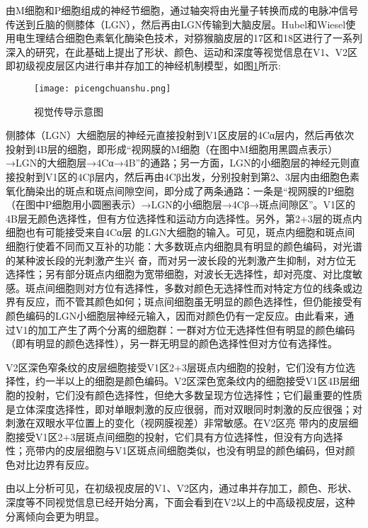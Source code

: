 \documentclass[a4paper,12pt]{article}
\begin{document}
由M细胞和P细胞组成的神经节细胞，通过轴突将由光量子转换而成的电脉冲信号传送到丘脑的侧膝体（LGN），然后再由LGN传输到大脑皮层。Hubel和Wiesel使用电生理结合细胞色素氧化酶染色技术，对猕猴脑皮层的17区和18区进行了一系列深入的研究，在此基础上提出了形状、颜色、运动和深度等视觉信息在V1、V2区即初级视皮层区内进行串并存加工的神经机制模型，如图\ref{fig 10}所示:


\begin{figure}[!htb]
\centering
\texttt{[image: picengchuanshu.png]}
\caption{视觉传导示意图}\label{fig 10} 
\end{figure}




侧膝体（LGN）大细胞层的神经元直接投射到V1区皮层的4Cα层内，然后再依次投射到4B层的细胞，即形成“视网膜的M细胞（在图中M细胞用黑圆点表示）→LGN的大细胞层→4Cα→4B”的通路；另一方面，LGN的小细胞层的神经元则直接投射到V1区的4Cβ层内，然后再由4Cβ出发，分别投射到第2、3层内由细胞色素氧化酶染出的斑点和斑点间隙空间，即分成了两条通路：一条是“视网膜的P细胞（在图中P细胞用小圆圈表示）→LGN的小细胞层→4Cβ→斑点间隙区”。V1区的4B层无颜色选择性，但有方位选择性和运动方向选择性\cite{15:book}。另外，第2+3层的斑点内细胞也有可能接受来自4Cα层 的LGN大细胞的输入。可见，斑点内细胞和斑点间细胞行使着不同而又互补的功能：大多数斑点内细胞具有明显的颜色编码，对光谱的某种波长段的光刺激产生兴 奋，而对另一波长段的光刺激产生抑制，对方位无选择性；另有部分斑点内细胞为宽带细胞，对波长无选择性，却对亮度、对比度敏感。斑点间细胞则对方位有选择性，多数对颜色无选择性而对特定方位的线条或边界有反应，而不管其颜色如何；斑点间细胞虽无明显的颜色选择性，但仍能接受有颜色编码的LGN小细胞层神经元输入，因而对颜色仍有一定反应。由此看来，通过V1的加工产生了两个分离的细胞群：一群对方位无选择性但有明显的颜色编码（即有明显的颜色选择性），另一群无明显的颜色选择性但对方位有选择性\cite{14:misc}。
         


V2区深色窄条纹的皮层细胞接受V1区2+3层斑点内细胞的投射，它们没有方位选择性，约一半以上的细胞是颜色编码。V2区深色宽条纹内的细胞接受V1区4B层细胞的投射，它们没有颜色选择性，但绝大多数呈现方位选择性；它们最重要的性质是立体深度选择性，即对单眼刺激的反应很弱，而对双眼同时刺激的反应很强；对刺激在双眼水平位置上的变化（视网膜视差）非常敏感。在V2区亮 带内的皮层细胞接受V1区2+3层斑点间细胞的投射，它们具有方位选择性，但没有方向选择性；亮带内的皮层细胞与V1区斑点间细胞类似，也没有明显的颜色编码，但对颜色对比边界有反应。
        


由以上分析可见，在初级视皮层的V1、V2区内，通过串并存加工，颜色、形状、深度等不同视觉信息已经开始分离，下面会看到在V2以上的中高级视皮层，这种分离倾向会更为明显。
        
\end{document}

